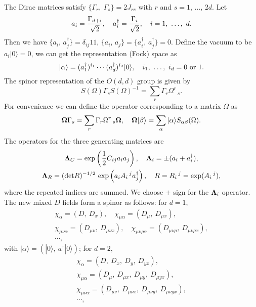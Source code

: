 \documentclass[a4paper,12pt]{article}
\newcommand{\mathbold}[1]{\mbox{\boldmath $#1$}}
\begin{document}
The Dirac matrices satisfy $\{\Gamma_r,\ \Gamma_s\}=2J_{rs}$
with $r$ and $s=1$, $\dots$, $2d$. Let
\begin{equation}
\label{crean}
a_i={\Gamma_{d+i}\over \sqrt{2}},\quad
a_i^\dag={\Gamma_i\over \sqrt{2}},\quad
i=1,\ \dots,\ d.
\end{equation}
Then we have $\{a_i$, $a_j^\dag\}=\delta_{ij}
1\!\!1$, $\{a_i$, $a_j\}=\{a_i^\dag$, $a_j^\dag\}=0$.
Define the vacuum to be $a_i|0\rangle=0$, we
can get the representation (Fock) space as
\begin{equation}
\label{state}
|\alpha\rangle=(a_1^\dag)^{i_1}\cdots
(a_d^\dag)^{i_d} |0\rangle, \quad 
i_1,\ \dots,\ i_d=0\ {\rm or}\ 1.
\end{equation}
The spinor representation of the $O(d,d)$ group is given by
\begin{equation}
\label{spinrep}
S(\Omega)\Gamma_s S(\Omega)^{-1}=\sum_r \Gamma_r\Omega^r\,_s.
\end{equation}
For convenience we can define the operator corresponding to
a matrix $\Omega$ as
\begin{equation}
\label{operator}
{\mathbold \Omega}\Gamma_s = \sum_r\Gamma_r\Omega^r\,_s
{\mathbold \Omega},\quad
{\mathbold \Omega}|\beta\rangle=\sum_\alpha 
|\alpha\rangle S_{\alpha\beta}(\Omega).
\end{equation}
The operators for the three generating 
matrices are \cite{brace98}\cite{fukuma99}
\begin{gather}
{\mathbold \Lambda}_C=\exp\left({1\over 2}
C_{ij}a_i a_j\right),\quad
{\mathbold \Lambda}_i=\pm (a_i+a_i^\dag),\\
{\mathbold \Lambda}_R=({\rm det}R)^{-1/2}\,\exp
\left(a_i A_i\,^j a_j^\dag\right),\quad
R=R_i\,^j=\exp(A_i\,^j),
\end{gather}
where the repeated indices are summed.
We choose $+$ sign for the ${\mathbold \Lambda}_i$ operator.
The new mixed $D$ fields form a spinor as follows: for $d=1$,
\begin{gather*}
\chi_\alpha=(D,\ D_x),\quad \chi_{\mu\alpha}=(D_\mu,\ D_{\mu x}),\\
\chi_{\mu\nu\alpha}=(D_{\mu\nu},\ D_{\mu\nu x}),\quad
\chi_{\mu\nu\rho\alpha}=(D_{\mu\nu\rho},\ D_{\mu\nu\rho x}),\\
\cdots,
\end{gather*}
with $|\alpha\rangle=(|0\rangle,\ a^\dag|0\rangle)$; for $d=2$,
\begin{gather*}
\chi_\alpha=(D,\ D_x,\ D_y,\ D_{yx}),\\
\chi_{\mu\alpha}=(D_\mu,\ D_{\mu x},\ D_{\mu y},
\ D_{\mu yx}),\\
\chi_{\mu\nu\alpha}=(D_{\mu\nu},\ D_{\mu\nu x},
\ D_{\mu\nu y},\ D_{\mu\nu yx}),\\
\cdots,
\end{gather*}
\end{document}
